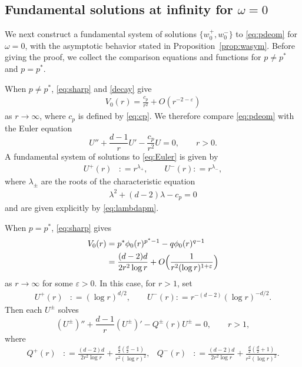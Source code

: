 \documentclass[12pt, a4paper, reqno]{amsart}
\numberwithin{equation}{section}
\theoremstyle{definition}
\theoremstyle{remark}
\newcommand{\ce}{\mathrel{\mathop:}=}
\begin{document}
\subsection{Fundamental solutions at infinity for \texorpdfstring{$\omega=0$}{omega = 0}}

We next construct a fundamental system of solutions
$\{w_0^+,w_0^-\}$ to \eqref{eq:pdeom} for $\omega=0$,
with the asymptotic behavior stated in Proposition~\ref{prop:wasym}.
Before giving the proof, we collect the comparison equations
and functions for $p\ne p^*$ and $p=p^*$.

When $p\ne p^*$, \eqref{eq:sharp} and \eqref{decay} give
\begin{align} \label{eq:Vnc}
    V_0(r)
    =\frac{c_p}{r^2}+O(r^{-2-\varepsilon})
\end{align}
as $r\to\infty$, where $c_p$ is defined by \eqref{eq:cp}.
We therefore compare \eqref{eq:pdeom} with the Euler equation
\begin{equation} \label{eq:Euler}
    U''
    +\frac{d-1}{r}U'
    -\frac{c_p}{r^2}U
    =0,\qquad r>0.
\end{equation}
A fundamental system of solutions to \eqref{eq:Euler} is given by
\begin{align*}
    U^+(r)&\ce r^{\lambda_+},
    \qquad
    U^-(r)\ce r^{\lambda_-},
\end{align*}
where $\lambda_\pm$ are the roots of the characteristic equation
\begin{align}
\label{eq-lam}
   \lambda^2+(d-2)\lambda-c_p=0
\end{align}
and are given explicitly by \eqref{eq:lambdapm}.

When $p=p^*$, \eqref{eq:sharp} gives
\begin{align}
    \notag
    V_0(r)
   &=p^*\phi_0(r)^{p^*-1}-q\phi_0(r)^{q-1}
\\  \label{eq:Vcrit}
   &=\frac{(d-2)d}{2r^{2}\log r}
    +O\Bigl(\frac{1}{r^{2}(\log r)^{1+\varepsilon}}\Bigr)
\end{align}
as $r\to\infty$ for some $\varepsilon>0$.
In this case, for $r>1$, set
\begin{align*}
    U^+(r)&\ce (\log r)^{d/2},
    \qquad
    U^-(r)\ce r^{-(d-2)}(\log r)^{-d/2}.
\end{align*}
Then each $U^\pm$ solves
\begin{equation*}
    (U^\pm)''
    +\frac{d-1}{r}(U^\pm)'
    -Q^\pm(r)U^\pm
    =0,\qquad r>1,
\end{equation*}
where
\begin{align} \label{eq:Qcrit}
    Q^+(r)
   &\ce \frac{(d-2)d}{2r^2\log r}+\frac{\tfrac{d}{2}(\tfrac{d}{2}-1)}{r^2(\log r)^2},&
    Q^-(r)
   &\ce \frac{(d-2)d}{2r^2\log r}+\frac{\tfrac{d}{2}(\tfrac{d}{2}+1)}{r^2(\log r)^2}.
\end{align}
\end{document}
